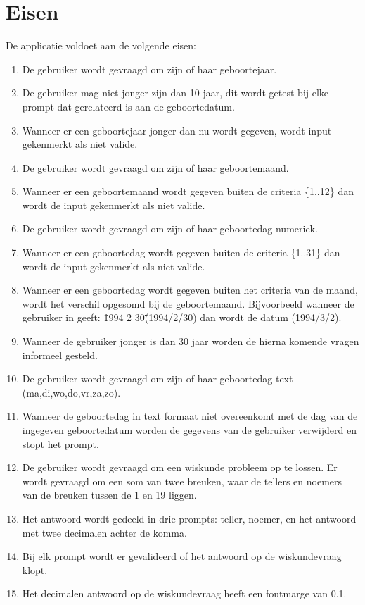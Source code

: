 \documentclass[10pt]{article}
\begin{document}
\section{Eisen}
De applicatie voldoet aan de volgende eisen:
\begin{enumerate}
  \item De gebruiker wordt gevraagd om zijn of haar geboortejaar.
  \item De gebruiker mag niet jonger zijn dan 10 jaar, dit wordt getest bij elke prompt dat gerelateerd is aan de
        geboortedatum.
  \item Wanneer er een geboortejaar jonger dan nu wordt gegeven, wordt input gekenmerkt als niet valide.
  \item De gebruiker wordt gevraagd om zijn of haar geboortemaand.
  \item Wanneer er een geboortemaand wordt gegeven buiten de criteria \{1..12\} dan wordt de input gekenmerkt als niet
        valide.
  \item De gebruiker wordt gevraagd om zijn of haar geboortedag numeriek.
  \item Wanneer er een geboortedag wordt gegeven buiten de criteria \{1..31\} dan wordt de input gekenmerkt als niet
        valide.
  \item Wanneer er een geboortedag wordt gegeven buiten het criteria van de maand, wordt het verschil opgesomd bij de
        geboortemaand. Bijvoorbeeld wanneer de gebruiker in geeft: \"1994 2 30\" (1994/2/30) dan wordt de datum
        (1994/3/2).
  \item Wanneer de gebruiker jonger is dan 30 jaar worden de hierna komende vragen informeel gesteld.
  \item De gebruiker wordt gevraagd om zijn of haar geboortedag text (ma,di,wo,do,vr,za,zo).
  \item Wanneer de geboortedag in text formaat niet overeenkomt met de dag van de ingegeven geboortedatum worden de
        gegevens van de gebruiker verwijderd en stopt het prompt.
  \item De gebruiker wordt gevraagd om een wiskunde probleem op te lossen. Er wordt gevraagd om een
        som van twee breuken, waar de tellers en noemers van de breuken tussen de 1 en 19 liggen.\
  \item Het antwoord wordt gedeeld in drie prompts: teller, noemer, en het antwoord met twee decimalen achter de komma.
  \item Bij elk prompt wordt er gevalideerd of het antwoord op de wiskundevraag klopt.
  \item Het decimalen antwoord op de wiskundevraag heeft een foutmarge van 0.1.

\end{enumerate}
\end{document}
